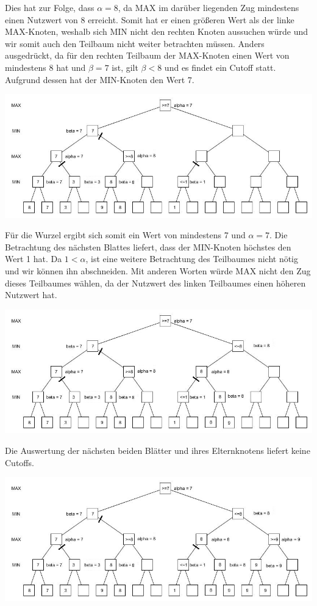  Dies hat zur Folge, dass $\alpha =8$, da MAX im darüber liegenden Zug mindestens einen Nutzwert von 8 erreicht. Somit hat er einen größeren Wert als der linke MAX-Knoten, weshalb sich MIN nicht den rechten Knoten aussuchen würde und wir somit auch den Teilbaum nicht weiter betrachten müssen. Anders ausgedrückt, da für den rechten Teilbaum der MAX-Knoten einen Wert von mindestens 8 hat und  $\beta = 7$ ist, gilt $\beta<8$ und es findet ein Cutoff statt. Aufgrund dessen hat der MIN-Knoten den Wert 7.

 \begin{center}
 	\includegraphics[width = 12 cm]{chapters/minimax/jpg/Alpha-beta7.jpg}
 \end{center}

 Für die Wurzel ergibt sich somit ein Wert von mindestens 7 und $\alpha = 7$.
 Die Betrachtung des nächsten Blattes liefert, dass der MIN-Knoten höchstes den Wert 1 hat. Da $1 < \alpha$, ist eine weitere Betrachtung des Teilbaumes nicht nötig und wir können ihn abschneiden. Mit anderen Worten würde MAX nicht den Zug dieses Teilbaumes wählen, da der Nutzwert des linken Teilbaumes einen höheren Nutzwert hat.

 \begin{center}
 	\includegraphics[width = 12 cm]{chapters/minimax/jpg/Alpha-beta8.jpg}
 \end{center}

 Die Auswertung der nächsten beiden Blätter und ihres Elternknotens liefert keine Cutoffs.

 \begin{center}
 	\includegraphics[width = 12 cm]{chapters/minimax/jpg/Alpha-beta9.jpg}
 \end{center}

